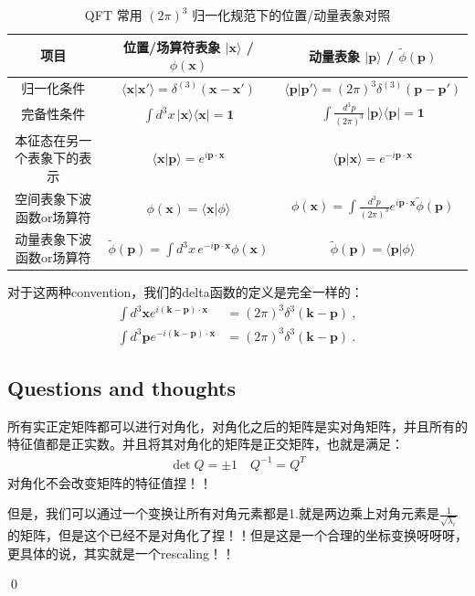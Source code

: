 \begin{table}[h!]
  \centering
  \begin{tabular}{ccc}
    \toprule
    \textbf{项目} & \textbf{位置/场算符表象 $|\mathbf{x}\rangle$ /
    $\phi(\mathbf{x})$} & \textbf{动量表象 $|\mathbf{p}\rangle$ /
    $\tilde{\phi}(\mathbf{p})$} \\
    \midrule
    归一化条件 &
    $\langle \mathbf{x}|\mathbf{x}'\rangle =
    \delta^{(3)}(\mathbf{x}-\mathbf{x}')$ &
    $\langle \mathbf{p}|\mathbf{p}'\rangle = (2\pi)^3
    \delta^{(3)}(\mathbf{p}-\mathbf{p}')$ \\
    完备性条件 &
    $\displaystyle \int d^3x\,|\mathbf{x}\rangle\langle \mathbf{x}| =
    \mathbf{1}$ &
    $\displaystyle \int
    \frac{d^3p}{(2\pi)^3}\,|\mathbf{p}\rangle\langle \mathbf{p}| =
    \mathbf{1}$ \\
    本征态在另一个表象下的表示 &
    $\langle \mathbf{x}|\mathbf{p}\rangle = e^{i\mathbf{p}\cdot\mathbf{x}}$ &
    $\langle \mathbf{p  }|\mathbf{x}\rangle =
    e^{-i\mathbf{p}\cdot\mathbf{x}}$ \\
    空间表象下波函数or场算符 &
    $\phi(\mathbf{x}) = \langle \mathbf{x}|\phi\rangle$ &
    $\phi(\mathbf{x}) = \int \frac{d^3p}{(2\pi)^3}
    e^{i\mathbf{p}\cdot\mathbf{x}} \tilde{\phi}(\mathbf{p})$ \\
    动量表象下波函数or场算符 &
    $\tilde{\phi}(\mathbf{p}) = \int d^3x\, e^{-i\mathbf{p}\cdot
    \mathbf{x}} \phi(\mathbf{x})$ &
    $\tilde{\phi}(\mathbf{p}) = \langle \mathbf{p}|\phi\rangle$ \\
    \bottomrule
  \end{tabular}
  \caption{QFT 常用 \((2\pi)^3\) 归一化规范下的位置/动量表象对照}
\end{table}

对于这两种convention，我们的delta函数的定义是完全一样的：
\begin{align}
  \int
  d^3\mathbf{x}e^{i(\mathbf{k-p})\cdot\mathbf{x}}&=(2\pi)^3\delta^3(\mathbf{k-p})\mathrm{~,}\\
  \int
  d^3\mathbf{p}e^{-i(\mathbf{k-p})\cdot\mathbf{x}}&=(2\pi)^3\delta^3(\mathbf{k-p})\mathrm{~.}
\end{align}

\subsection{Questions and thoughts}


所有实正定矩阵都可以进行对角化，对角化之后的矩阵是实对角矩阵，并且所有的特征值都是正实数。并且将其对角化的矩阵是正交矩阵，也就是满足：
\begin{align}
  \det Q=\pm1 \quad Q^{-1}=Q^T
\end{align}
对角化不会改变矩阵的特征值捏！！

但是，我们可以通过一个变换让所有对角元素都是1.就是两边乘上对角元素是$
\displaystyle\frac{1}{\sqrt{\lambda_i}}
$的矩阵，但是这个已经不是对角化了捏！！但是这是一个合理的坐标变换呀呀呀，更具体的说，其实就是一个rescaling！！

\qed
